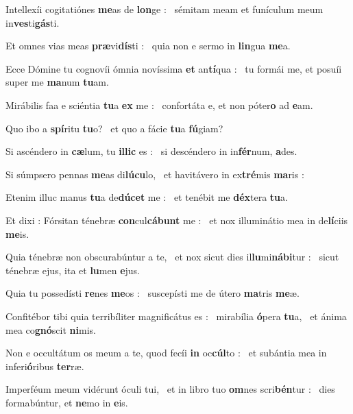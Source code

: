 \documentclass[12pt]{article} %
\newenvironment{psalmtext}{\leftskip 0.25in}{\vspace{1 mm}}
\let\oldgresixstar\gresixstar
\renewcommand{\gresixstar}{\textcolor{benred8}{\oldgresixstar}}
\let\oldgredagger\gredagger
\renewcommand{\gredagger}{\textcolor{benred8}{\oldgredagger}}
\begin{document}
\begin{psalmtext}
Intellexíi cogitatiónes \textbf{me}as de \textbf{lon}ge : \gresixstar\ sémitam meam et funículum meum in\textbf{ves}ti\textbf{gás}ti.

Et omnes vias meas \textbf{præ}vi\textbf{dís}ti : \gresixstar\ quia non e sermo in \textbf{lin}gua \textbf{me}a.

Ecce Dómine tu cognovíi ómnia novíssima \textbf{et} an\textbf{tí}qua : \gresixstar\ tu formái me, et posuíi super me \textbf{ma}num \textbf{tu}am.

Mirábilis faa e sciéntia \textbf{tu}a \textbf{ex} me : \gresixstar\ confortáta e, et non póter\textbf{o} ad \textbf{e}am.

Quo ibo a \textbf{spí}ritu \textbf{tu}o? \gresixstar\ et quo a fácie \textbf{tu}a \textbf{fú}giam?

Si ascéndero in \textbf{cæ}lum, tu \textbf{illic} es : \gresixstar\ si descéndero in in\textbf{fér}num, \textbf{a}des.

Si súmpsero pennas \textbf{me}as di\textbf{lúcu}lo, \gresixstar\ et havitávero in ex\textbf{tré}mis \textbf{ma}ris :

Etenim illuc manus \textbf{tu}a de\textbf{dúcet} me : \gresixstar\ et tenébit me \textbf{déx}tera \textbf{tu}a.

Et dixi : Fórsitan ténebræ \textbf{con}cul\textbf{cábunt} me : \gresixstar\ et nox illuminátio mea in de\textbf{lí}ciis \textbf{me}is.

Quia ténebræ non obscurabúntur a te, \gredagger\ et nox sicut dies il\textbf{lu}mi\textbf{nábi}tur : \gresixstar\ sicut ténebræ ejus, ita et \textbf{lu}men \textbf{e}jus.

Quia tu possed\'{i}sti \textbf{re}nes \textbf{me}os : \gresixstar\ suscep\'{i}sti me de \'{u}tero \textbf{ma}tris \textbf{me}\ae .

Confitébor tibi quia terribíliter magnificátus es : \gredagger\ mirabília \textbf{ó}pera \textbf{tu}a, \gresixstar\ et ánima mea co\textbf{gnó}scit \textbf{ni}mis.

Non e occultátum os meum a te, quod fecíi \textbf{in} oc\textbf{cúl}to : \gresixstar\ et subántia mea in inferi\textbf{ó}ribus \textbf{ter}ræ.

Imperféum meum vidérunt óculi tui, \gredagger\ et in libro tuo \textbf{om}nes scri\textbf{bén}tur : \gresixstar\ dies formabúntur, et \textbf{ne}mo in \textbf{e}is.


\end{psalmtext}
\end{document}
